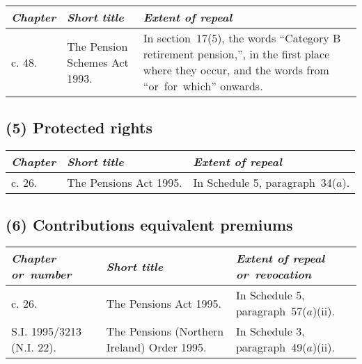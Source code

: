 \documentclass[12pt,a4paper]{article}
\begin{document}
{\footnotesize
\begin{longtable}{p{45.96pt}p{55.78545pt}p{252.25719pt}}
\hline
\itshape Chapter	&\itshape Short title	&\itshape Extent of repeal\\
\hline
\endhead
\hline
\endlastfoot
1993 c. 48. 	&The Pension Schemes Act 1993. 	&In section~17(5), the words “Category B retirement pension,”, in the first place where they occur, and the words from “or~for~which” onwards.\\
\end{longtable}

}

\subsection*{(5) 
Protected rights}

{\footnotesize
\begin{longtable}{lll}
\hline
\itshape Chapter	&\itshape Short title	&\itshape Extent of repeal\\
\hline
\endhead
\hline
\endlastfoot
1995 c. 26. 	&The Pensions Act 1995. 	&In Schedule 5, paragraph~34($a$).\\
\end{longtable}

}

\subsection*{(6) 
Contributions equivalent premiums}

{\footnotesize
\begin{longtable}{p{81.02374pt}p{155.22356pt}p{117.7467pt}}
\hline
\itshape Chapter or~number	&\itshape Short title	&\itshape Extent of repeal or~revocation\\
\hline
\endhead
\hline
\endlastfoot
1995 c. 26. 	&The Pensions Act 1995. 	&In Schedule 5, paragraph~57($a$)(ii).\\
S.I. 1995/3213 (N.I. 22).	&The Pensions (Northern Ireland) Order 1995. 	&In Schedule 3, paragraph~49($a$)(ii).\\
\end{longtable}

}
\end{document}
